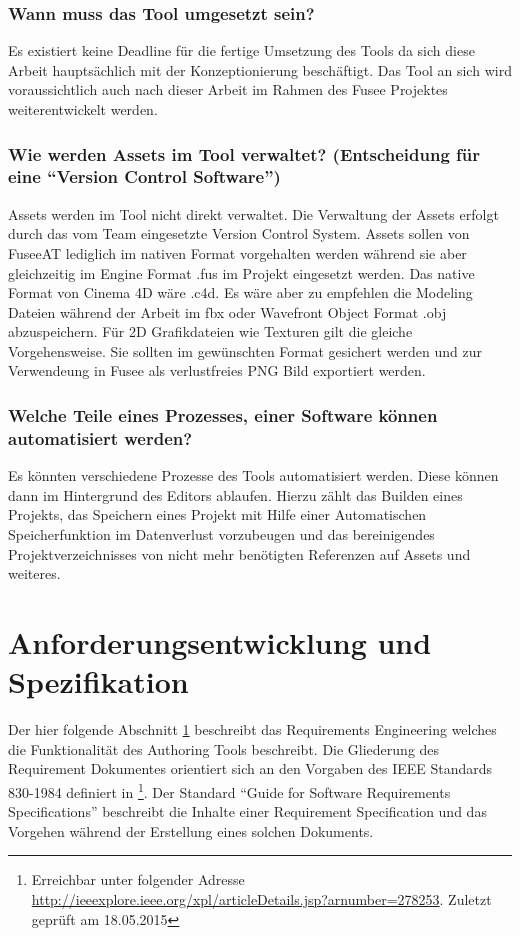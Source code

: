 \documentclass[pagesize, paper=a4, fontsize=12pt, titlepage=true, headings=small, headnosepline, abstractoff, liststotoc, nochapterprefix, plainheadsepline, twoside]{scrreprt}
\begin{document}
\subsubsection{Wann muss das Tool umgesetzt sein?}
Es existiert keine Deadline für die fertige Umsetzung des Tools da sich diese Arbeit hauptsächlich mit der Konzeptionierung beschäftigt. Das Tool an sich wird voraussichtlich auch nach dieser Arbeit im Rahmen des Fusee Projektes weiterentwickelt werden.

\subsubsection{Wie werden Assets im Tool verwaltet? (Entscheidung für eine “Version Control Software”)}
Assets werden im Tool nicht direkt verwaltet. Die Verwaltung der Assets erfolgt durch das vom Team eingesetzte Version Control System. Assets sollen von FuseeAT lediglich im nativen Format vorgehalten werden während sie aber gleichzeitig im Engine Format .fus im Projekt eingesetzt werden. Das native Format von Cinema 4D wäre .c4d. Es wäre aber zu empfehlen die Modeling Dateien während der Arbeit im fbx oder Wavefront Object Format .obj abzuspeichern. Für 2D Grafikdateien wie Texturen gilt die gleiche Vorgehensweise. Sie sollten im gewünschten Format gesichert werden und zur Verwendeung in Fusee als verlustfreies PNG Bild exportiert werden.

\subsubsection{Welche Teile eines Prozesses, einer Software können automatisiert werden?}
Es könnten verschiedene Prozesse des Tools automatisiert werden. Diese können dann im Hintergrund des Editors ablaufen. Hierzu zählt das Builden eines Projekts, das Speichern eines Projekt mit Hilfe einer Automatischen Speicherfunktion im Datenverlust vorzubeugen und das bereinigendes Projektverzeichnisses von nicht mehr benötigten Referenzen auf Assets und weiteres.


\section{Anforderungsentwicklung und Spezifikation}\label{sec:RAD}
Der hier folgende Abschnitt \ref{sec:RAD} beschreibt das Requirements Engineering welches die Funktionalität des Authoring Tools beschreibt. Die Gliederung des Requirement Dokumentes orientiert sich an den Vorgaben des IEEE Standards 830-1984 definiert in \footnote{Erreichbar unter folgender Adresse \url{http://ieeexplore.ieee.org/xpl/articleDetails.jsp?arnumber=278253}. Zuletzt geprüft am 18.05.2015}. Der Standard “Guide for Software Requirements Specifications” beschreibt die Inhalte einer Requirement Specification und das Vorgehen während der Erstellung eines solchen Dokuments.
\end{document}

